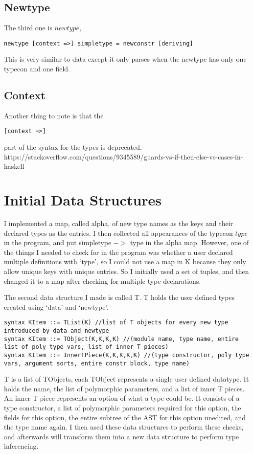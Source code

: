 \subsection{Newtype}
The third one is $newtype$,
\begin{lstlisting}
newtype [context =>] simpletype = newconstr [deriving]
\end{lstlisting}
This is very similar to data except it only parses when the newtype has only one typecon and one field.

\subsection{Context}
Another thing to note is that the
\begin{lstlisting}
[context =>]
\end{lstlisting}
part of the syntax for the types is deprecated.
https://stackoverflow.com/questions/9345589/guards-vs-if-then-else-vs-cases-in-haskell

\section{Initial Data Structures}

I implemented a map, called alpha, of new type names as the keys and their declared types as the entries. I then collected all appearances of the typecon $type$ in the program, and put simpletype $->$ type in the alpha map. However, one of the things I needed to check for in the program was whether a user declared multiple definitions with ‘type’, so I could not use a map in K because they only allow unique keys with unique entries. So I initially used a set of tuples, and then changed it to a map after checking for multiple type declarations.


The second data structure I made is called T. T holds the user defined types created using ‘data’ and ‘newtype’.
\begin{lstlisting}
syntax KItem ::= TList(K) //list of T objects for every new type introduced by data and newtype
syntax KItem ::= TObject(K,K,K,K) //(module name, type name, entire list of poly type vars, list of inner T pieces)
syntax KItem ::= InnerTPiece(K,K,K,K,K) //(type constructor, poly type vars, argument sorts, entire constr block, type name)
\end{lstlisting}
T is a list of TObjects, each TObject represents a single user defined datatype. It holds the name, the list of polymorphic parameters, and a list of inner T pieces.
An inner T piece represents an option of what a type could be. It consists of a type constructor, a list of polymorphic parameters required for this option, the fields for this option, the entire subtree of the AST for this option unedited, and the type name again.
I then used these data structures to perform these checks, and afterwards will transform them into a new data structure to perform type inferencing.

